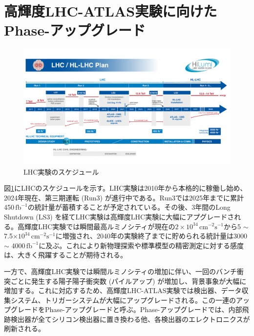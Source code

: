 

\section{高輝度LHC-ATLAS実験に向けたPhase-\two アップグレード}
\label{sec_intro_phase2upgrade}

\begin{figure} 
\centering
\includegraphics[width=16cm]{fig/Intro/LHCschedule.pdf}
\caption[LHC実験のスケージュール]{LHC実験のスケジュール\cite{cern_hllhc_industry}}
\label{LHCschedule}
\end{figure}

図\ref{LHCschedule}にLHCのスケジュールを示す。LHC実験は2010年から本格的に稼働し始め、2024年現在、第三期運転 (Run3) が進行中である。Run3では2025年までに累計450\,$\mathrm{fb}^{-1}$の統計量が蓄積することが予定されている。その後、3年間のLong Shutdown (LS3) を経てLHC実験は高輝度LHC実験に大幅にアプグレードされる。高輝度LHC実験では瞬間最高ルミノシティが現在の$2\times10^{34}\,\mathrm{cm}^{-2}\mathrm{s}^{-1}$から5 $\sim$ 7.5$\times10^{34}\,\mathrm{cm}^{-2}\mathrm{s}^{-1}$に増強され、2040年の実験終了までに貯められる統計量は3000  $\sim$ 4000\,$\mathrm{fb}^{-1}$に及ぶ。これにより新物理探索や標準模型の精密測定に対する感度は、大きく飛躍することが期待される。

一方で、高輝度LHC実験では瞬間ルミノシティの増加に伴い、一回のバンチ衝突ごとに発生する陽子陽子衝突数 (パイルアップ) が増加し、背景事象が大幅に増加する。これに対応するため、高輝度LHC-ATLAS実験では検出器、データ収集システム、トリガーシステムが大幅にアップグレードされる。この一連のアップグレードをPhase-\two アップグレードと呼ぶ。Phase-\two アップグレードでは、内部飛跡検出器が全てシリコン検出器に置き換わる他、各検出器のエレクトロニクスが刷新される。

